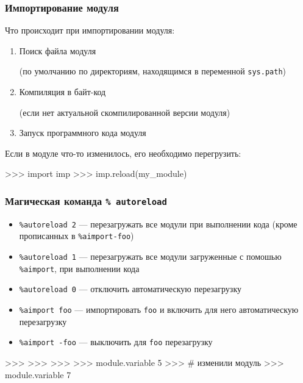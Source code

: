 \documentclass[fleqn, xcolor=x11names, 11pt]{beamer}
\begin{document}
\begin{frame}[fragile]\frametitle{Импортирование модуля}

Что происходит при импортировании модуля:

\begin{enumerate}

\item Поиск файла модуля

(по умолчанию по директориям, находящимся в переменной  \texttt{sys.path})

\item Компиляция в байт-код

(если нет актуальной скомпилированной версии модуля)

\item Запуск программного кода модуля

\end{enumerate}

\hfill

Если в модуле что-то изменилось, его необходимо перегрузить:

\begin{pcode}
>>> import imp
>>> imp.reload(my_module)
\end{pcode}


\end{frame}

\begin{frame}[fragile]\frametitle{Магическая команда \texttt{\% autoreload}}
\begin{itemize}
	\item \texttt{\%autoreload 2} --- перезагружать все модули при выполнении кода (кроме прописанных в \texttt{\%aimport-foo})
    \item \texttt{\%autoreload 1} --- перезагружать все модули загруженные с помошью  \texttt{\%aimport}, при выполнении кода 
    \item \texttt{\%autoreload 0} --- отключить автоматическую перезагрузку
    \item \texttt{\%aimport foo} --- импортировать \texttt{foo} и включить для него автоматическую перезагрузку
    \item  \texttt{\%aimport -foo} --- выключить для \texttt{foo} перезагрузку
\end{itemize}
 
\hfill

\begin{pcode}
>>> %
>>> %
>>> %
>>> module.variable
5
>>> # изменили модуль
>>> module.variable
7
\end{pcode}

\end{frame}
\end{document}
